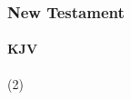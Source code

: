 			
		
		
	\subsubsection{New Testament} %
		\label{HEART-NT}
	
		\paragraph{KJV}
			\label{HEART-NT-KJV}
			
	
			
			\begin{compactdesc}
				\item[{\hyperref[MATTHEW-15-18]{Matthew 15:18--19}}] (2)
			\end{compactdesc}
			
		
			
				
